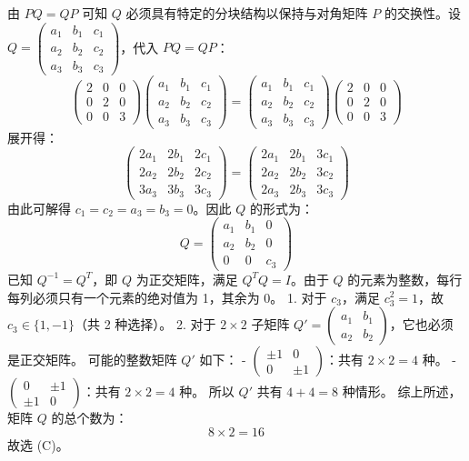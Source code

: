 \begin{questions}
\begin{solution}
由 $PQ = QP$ 可知 $Q$ 必须具有特定的分块结构以保持与对角矩阵 $P$ 的交换性。设 $Q = \begin{pmatrix} a_1 & b_1 & c_1 \\ a_2 & b_2 & c_2 \\ a_3 & b_3 & c_3 \end{pmatrix}$，代入 $PQ = QP$：
\[
\begin{pmatrix} 2 & 0 & 0 \\ 0 & 2 & 0 \\ 0 & 0 & 3 \end{pmatrix} \begin{pmatrix} a_1 & b_1 & c_1 \\ a_2 & b_2 & c_2 \\ a_3 & b_3 & c_3 \end{pmatrix} = \begin{pmatrix} a_1 & b_1 & c_1 \\ a_2 & b_2 & c_2 \\ a_3 & b_3 & c_3 \end{pmatrix} \begin{pmatrix} 2 & 0 & 0 \\ 0 & 2 & 0 \\ 0 & 0 & 3 \end{pmatrix}
\]
展开得：
\[
\begin{pmatrix} 2a_1 & 2b_1 & 2c_1 \\ 2a_2 & 2b_2 & 2c_2 \\ 3a_3 & 3b_3 & 3c_3 \end{pmatrix} = \begin{pmatrix} 2a_1 & 2b_1 & 3c_1 \\ 2a_2 & 2b_2 & 3c_2 \\ 2a_3 & 2b_3 & 3c_3 \end{pmatrix}
\]
由此可解得 $c_1 = c_2 = a_3 = b_3 = 0$。因此 $Q$ 的形式为：
\[
Q = \begin{pmatrix} a_1 & b_1 & 0 \\ a_2 & b_2 & 0 \\ 0 & 0 & c_3 \end{pmatrix}
\]
已知 $Q^{-1} = Q^T$，即 $Q$ 为正交矩阵，满足 $Q^T Q = I$。由于 $Q$ 的元素为整数，每行每列必须只有一个元素的绝对值为 1，其余为 0。
1. 对于 $c_3$，满足 $c_3^2 = 1$，故 $c_3 \in \{1, -1\}$（共 2 种选择）。
2. 对于 $2 \times 2$ 子矩阵 $Q' = \begin{pmatrix} a_1 & b_1 \\ a_2 & b_2 \end{pmatrix}$，它也必须是正交矩阵。
可能的整数矩阵 $Q'$ 如下：
- $\begin{pmatrix} \pm 1 & 0 \\ 0 & \pm 1 \end{pmatrix}$：共有 $2 \times 2 = 4$ 种。
- $\begin{pmatrix} 0 & \pm 1 \\ \pm 1 & 0 \end{pmatrix}$：共有 $2 \times 2 = 4$ 种。
所以 $Q'$ 共有 $4 + 4 = 8$ 种情形。
综上所述，矩阵 $Q$ 的总个数为：
\[
8 \times 2 = 16
\]
故选 (C)。
\end{solution}


\end{questions}
